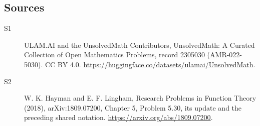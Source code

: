 \documentclass[11pt]{article}
\begin{document}
\subsection{Sources}
\begin{description}
\item[\hypertarget{source:2305030:1}{S1}] ULAM.AI and the UnsolvedMath Contributors, UnsolvedMath: A Curated Collection of Open Mathematics Problems, record 2305030 (AMR-022-5030). CC BY 4.0. \url{https://huggingface.co/datasets/ulamai/UnsolvedMath}.
\item[\hypertarget{source:2305030:2}{S2}] W. K. Hayman and E. F. Lingham, Research Problems in Function Theory (2018), arXiv:1809.07200, Chapter 5, Problem 5.30, its update and the preceding shared notation. \url{https://arxiv.org/abs/1809.07200}.
\end{description}
\label{end:2305030}
\end{document}
